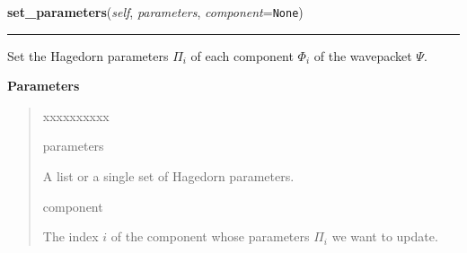 \hspace{.8\funcindent}\begin{boxedminipage}{\funcwidth}

    \raggedright \textbf{set\_parameters}(\textit{self}, \textit{parameters}, \textit{component}={\tt None})

    \vspace{-1.5ex}

    \rule{\textwidth}{0.5\fboxrule}
\setlength{\parskip}{2ex}
    Set the Hagedorn parameters $\Pi_i$ of each component
    $\Phi_i$ of the wavepacket $\Psi$.

\setlength{\parskip}{1ex}
      \textbf{Parameters}
      \vspace{-1ex}

      \begin{quote}
        \begin{Ventry}{xxxxxxxxxx}

          \item[parameters]

          A list or a single set of Hagedorn parameters.

          \item[component]

          The index $i$ of the component whose parameters
          $\Pi_i$ we want to update.

        \end{Ventry}

      \end{quote}

    \end{boxedminipage}

    \label{HagedornMultiWavepacket:HagedornMultiWavepacket:set_quadrator}

    \vspace{0.5ex}


